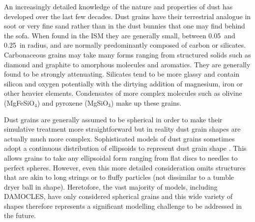 An increasingly detailed knowledge of the nature and properties of dust has developed over the last few decades. Dust grains have their terrestrial analogue in soot or very fine sand rather than in the dust bunnies that one may find behind the sofa.  When found in the ISM they are generally small, between 0.05\micron\ and 0.25\micron\ in radius, and are normally predominantly composed of carbon or silicates.  Carbonaceous grains may take many forms ranging from structured solids such as diamond and graphite to amorphous molecules and aromatics.  They are generally found to be strongly attenuating.  Silicates tend to be more glassy and contain silicon and oxygen potentially with the dirtying addition of magnesium, iron or other heavier elements.  Condensates of more complex molecules such as olivine (MgFeSiO$_4$) and pyroxene (MgSiO$_3$) make up these grains.  



Dust grains are generally assumed to be spherical in order to make their simulative treatment more straightforward but in reality dust grain shapes are actually much more complex.  Sophisticated models of dust grains sometimes adopt a continuous distribution of ellipsoids to represent dust grain shape \citep{Bohren1983}.  This allows grains to take any ellipsoidal form ranging from flat discs to needles to perfect spheres.  However, even this more detailed consideration omits structures that are akin to long strings or to fluffy particles (not dissimilar to a tumble dryer ball in shape). Heretofore, the vast majority of models, including DAMOCLES, have only considered spherical grains and this wide variety of shapes therefore represents a significant modelling challenge to be addressed in the future.

%


